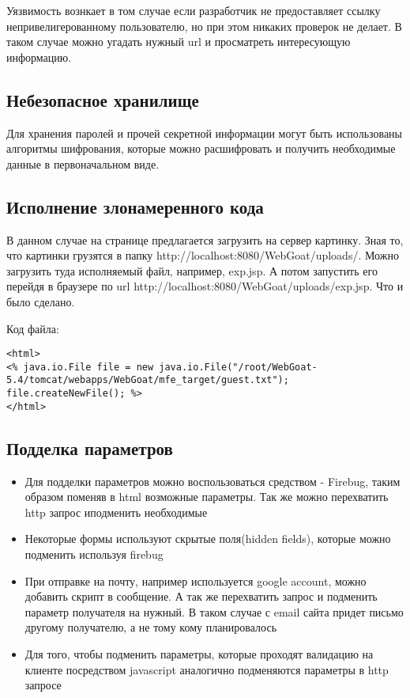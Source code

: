\documentclass{article}
\begin{document}
Уязвимость вознкает в том случае если разработчик не предоставляет ссылку непривелигерованному пользователю, но при этом никаких проверок не делает. В таком случае можно угадать нужный url и просматреть интересующую информацию.


\subsection{Небезопасное хранилище}

Для хранения паролей и прочей секретной информации могут быть использованы алгоритмы шифрования, которые можно расшифровать и получить необходимые данные в первоначальном виде.


\subsection{Исполнение злонамеренного кода}

В данном случае на странице предлагается загрузить на сервер картинку. Зная то, что картинки грузятся в папку  http://localhost:8080/WebGoat/uploads/. Можно загрузить туда исполняемый файл, например, exp.jsp. А потом запустить его перейдя в браузере по url http://localhost:8080/WebGoat/uploads/exp.jsp. Что и было сделано.

Код файла: 

\begin{verbatim}
<html>
<% java.io.File file = new java.io.File("/root/WebGoat-5.4/tomcat/webapps/WebGoat/mfe_target/guest.txt");
file.createNewFile(); %>
</html>
\end{verbatim}


\subsection{Подделка параметров}

\begin{itemize}
	
	\item Для подделки параметров можно воспользоваться средством - Firebug, таким образом поменяв в html возможные параметры. Так же можно перехватить http запрос иподменить необходимые
	
	\item Некоторые формы используют скрытые поля(hidden fields), которые можно подменить используя firebug
	
	\item При отправке на почту, например используется google account, можно добавить скрипт в сообщение. А так же перехватить запрос и подменить параметр получателя на нужный. В таком случае с email сайта придет письмо другому получателю, а не тому кому планировалось
	
	\item Для того, чтобы подменить параметры, которые проходят валидацию на клиенте посредством javascript аналогично подменяются параметры в http запросе
	
\end{itemize}
\end{document}
